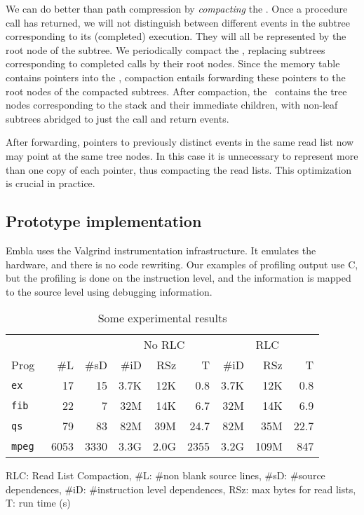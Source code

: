 \documentclass[times, 10pt,twocolumn]{article}
\begin{document}
We can do better than path compression by {\em compacting} the \tracepile. 
Once a procedure call has returned, we will not distinguish between 
different events in the subtree corresponding to its (completed) 
execution. They will all be represented by the root node of the subtree.
We periodically compact the \tracepile, replacing subtrees
corresponding to completed calls by their root nodes. Since the 
memory table contains pointers into the \tracepile, compaction
entails forwarding these pointers to the root nodes of the compacted 
subtrees.
After compaction, the \tracepile\ contains the
tree nodes corresponding to the stack and their immediate children,
with non-leaf subtrees abridged to just the call and return events.

After forwarding, pointers to previously distinct events in the same read list 
now may point at the same 
tree nodes. In this case it is unnecessary to represent more than one 
copy of each pointer, thus compacting the read lists. This optimization is 
crucial in practice.

\subsection{Prototype implementation}

Embla uses the Valgrind instrumentation infrastructure.  It emulates
the hardware, and there is no code rewriting.  Our examples of profiling
output use C, but
the profiling is done on the instruction level, and the information is
mapped to the source level using debugging information.



\begin{table}
\begin{center} \newcommand{\sms}{\hskip0.4em}
\begin{tabular}{|@{\sms}l@{\sms}|r@{\sms}r|r@{\sms}r@{\sms}r|r@{\sms}r@{\sms}r|} \hline
 & & & \multicolumn{3}{|c|}{No RLC} & 
\multicolumn{3}{c|}{RLC} \\
Prog & \#L & \#sD & \#iD & RSz & T 
                              & \#iD & RSz & T \\ \hline
\tt ex & 17 & 15 & 3.7K & 12K & 0.8 & 3.7K & 12K & 0.8 \\
\tt fib & 22 & 7 & 32M & 14K & 6.7 & 32M & 14K & 6.9 \\
\tt qs & 79 & 83 & 82M & 39M & 24.7 & 82M & 35M & 22.7 \\
\tt mpeg & 6053 & 3330 & 3.3G & 2.0G & 2355 & 3.2G & 109M & 847 \\ \hline
\end{tabular}
\end{center}
RLC: Read List Compaction, 
\#L: \#non blank source lines, \#sD: \#source dependences, \#iD: 
\#instruction
level dependences, RSz: max bytes for read lists, T: run time (s)
\caption{Some experimental results} \label{trex}
\end{table}
\end{document}
